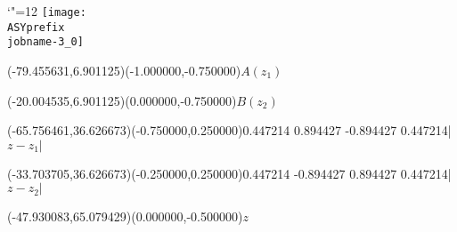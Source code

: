 \setlength{\unitlength}{1pt}%
\makeatletter%
\let\ASYencoding\f@encoding%
\let\ASYfamily\f@family%
\let\ASYseries\f@series%
\let\ASYshape\f@shape%
\makeatother%
{\catcode`"=12%
\texttt{[image: \\ASYprefix\\jobname-3\_0]}%
}%
%
\fontsize{6.000000}{7.200000}\selectfont%
\usefont{\ASYencoding}{\ASYfamily}{\ASYseries}{\ASYshape}%
\ASYalign(-79.455631,6.901125)(-1.000000,-0.750000){$A(z_1)$}%
%
\fontsize{6.000000}{7.200000}\selectfont%
\ASYalign(-20.004535,6.901125)(0.000000,-0.750000){$B(z_2)$}%
%
\fontsize{6.000000}{7.200000}\selectfont%
\ASYalignT(-65.756461,36.626673)(-0.750000,0.250000){0.447214 0.894427 -0.894427 0.447214}{|$z - z_1|$}%
%
\fontsize{6.000000}{7.200000}\selectfont%
\ASYalignT(-33.703705,36.626673)(-0.250000,0.250000){0.447214 -0.894427 0.894427 0.447214}{|$z - z_2|$}%
%
\fontsize{6.000000}{7.200000}\selectfont%
\ASYalign(-47.930083,65.079429)(0.000000,-0.500000){$z$}%
